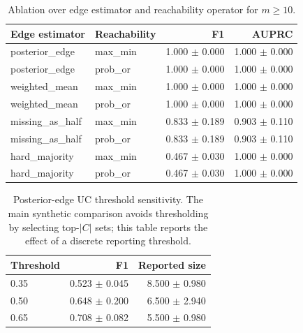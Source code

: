 \begin{table}[t]
\centering
\caption{Ablation over edge estimator and reachability operator for $m\ge10$.}
\begin{tabular}{llrr}
\toprule
Edge estimator & Reachability & F1 & AUPRC \\ 
\midrule
posterior_edge & max_min & 1.000 $\pm$ 0.000 & 1.000 $\pm$ 0.000 \\ 
posterior_edge & prob_or & 1.000 $\pm$ 0.000 & 1.000 $\pm$ 0.000 \\ 
weighted_mean & max_min & 1.000 $\pm$ 0.000 & 1.000 $\pm$ 0.000 \\ 
weighted_mean & prob_or & 1.000 $\pm$ 0.000 & 1.000 $\pm$ 0.000 \\ 
missing_as_half & max_min & 0.833 $\pm$ 0.189 & 0.903 $\pm$ 0.110 \\ 
missing_as_half & prob_or & 0.833 $\pm$ 0.189 & 0.903 $\pm$ 0.110 \\ 
hard_majority & max_min & 0.467 $\pm$ 0.030 & 1.000 $\pm$ 0.000 \\ 
hard_majority & prob_or & 0.467 $\pm$ 0.030 & 1.000 $\pm$ 0.000 \\ 
\bottomrule
\end{tabular}
\end{table}

\begin{table}[t]
\centering
\caption{Posterior-edge UC threshold sensitivity. The main synthetic comparison avoids thresholding by selecting top-$|C|$ sets; this table reports the effect of a discrete reporting threshold.}
\begin{tabular}{lrr}
\toprule
Threshold & F1 & Reported size \\ 
\midrule
0.35 & 0.523 $\pm$ 0.045 & 8.500 $\pm$ 0.980 \\ 
0.50 & 0.648 $\pm$ 0.200 & 6.500 $\pm$ 2.940 \\ 
0.65 & 0.708 $\pm$ 0.082 & 5.500 $\pm$ 0.980 \\ 
\bottomrule
\end{tabular}
\end{table}

